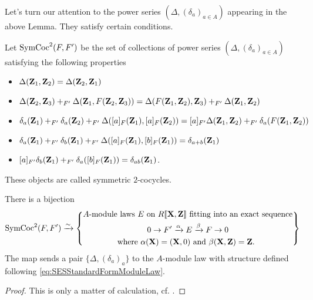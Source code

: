 \documentclass[../main.tex]{subfiles}
\begin{document}
Let's turn our attention to the power series $(\Delta, (\delta_a)_{a\in A})$
appearing in the above Lemma. They satisfy certain conditions.
\begin{defi}\label{def:SymCoc2}
  Let $\operatorname{SymCoc}^2(F, F')$ be the set of collections of power series $(\Delta,
  (\delta_a)_{a \in A})$ satisfying the following properties
  \begin{itemize}
    \item $\Delta(\mathbf{Z}_1,\mathbf{Z}_2) = \Delta(\mathbf{Z}_2,\mathbf{Z}_1)$
    \item $\Delta(\mathbf{Z}_2,\mathbf{Z}_3) +_{F'} \Delta(\mathbf{Z}_1, F(\mathbf{Z}_2,\mathbf{Z}_3)) = \Delta(F(\mathbf{Z}_1,\mathbf{Z}_2), \mathbf{Z}_3) +_{F'} \Delta(\mathbf{Z}_1,\mathbf{Z}_2)$
    \item $\delta_a(\mathbf{Z}_1) +_{F'} \delta_a(\mathbf{Z}_2) +_{F'} \Delta([a]_F(\mathbf{Z}_1), [a]_F(\mathbf{Z}_2)) = 
      [a]_{F'}\Delta(\mathbf{Z}_1,\mathbf{Z}_2) +_{F'} \delta_a(F(\mathbf{Z}_1,\mathbf{Z}_2))$
    \item $\delta_a(\mathbf{Z}_1) +_{F'} \delta_b(\mathbf{Z}_1) +_{F'} \Delta([a]_F(\mathbf{Z}_1), [b]_F(\mathbf{Z}_1)) =
      \delta_{a+b}(\mathbf{Z}_1)$
    \item $[a]_{F'}\delta_b(\mathbf{Z}_1) +_{F'} \delta_a([b]_F(\mathbf{Z}_1)) = \delta_{ab}(\mathbf{Z}_1)$.
  \end{itemize}
  These objects are called symmetric $2$-cocycles. 
\end{defi}
\begin{prop}\label{prop:ClassOfFGLitoSymCoc}
  There is a bijection 
  \begin{equation*}
    \operatorname{SymCoc}^2(F, F') \xrightarrow{\sim} \left\{
      \begin{gathered}
        \text{$A$-module laws $E$ on $R\llbracket \mathbf{X}, \mathbf{Z} \rrbracket$ fitting into an
        exact sequence}
        \\ 0 \to F' \xrightarrow{\alpha} E \xrightarrow{\beta} F \to 0 \\
        \text{where $\alpha(\mathbf{X}) = (\mathbf{X}, 0)$ and $\beta(\mathbf{X}, \mathbf{Z}) = \mathbf{Z}$. }
      \end{gathered}
      \right\}
  \end{equation*}
  The map sends a pair $\{\Delta, (\delta_a)_a\}$ to the $A$-module law with
  structure defined following \eqref{eq:SESStandardFormModuleLaw}. 
  \begin{proof}[Proof]
    This is only a matter of calculation, cf. \cite[Section
    6]{hopkins1994equivariant}.
  \end{proof}
\end{prop}
\end{document}
